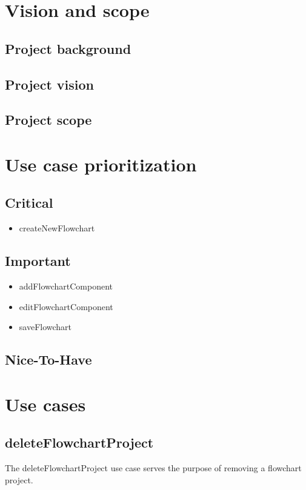 \documentclass[11pt,a4paper,titlepage]{article}
\begin{document}


\tableofcontents
\pagebreak

\section{Vision and scope}
\subsection{Project background}
\subsection{Project vision}
\subsection{Project scope}



\newpage	
\section{Use case prioritization}
\subsection{Critical}
\begin{itemize}
  \item createNewFlowchart
\end{itemize}
\subsection{Important}
\begin{itemize}
  \item addFlowchartComponent
  \item editFlowchartComponent
  \item saveFlowchart
\end{itemize}
\subsection{Nice-To-Have}

\newpage
\section{Use cases}
	
\subsection{deleteFlowchartProject}
The deleteFlowchartProject use case serves the purpose of removing a flowchart project.
\end{document}
